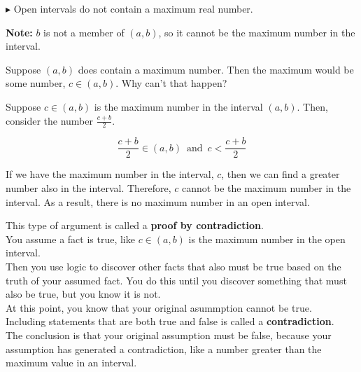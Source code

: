 \documentclass{ximera}
\begin{document}
$\blacktriangleright$ Open intervals do not contain a maximum real number.

\textbf{Note:} $b$ is not a member of $(a,b)$, so it cannot be the maximum number in the interval.   


\begin{explanation}

Suppose $(a,b)$ does contain a maximum number. Then the maximum would be some number, $c \in (a,b)$.  Why can't that happen?  


Suppose $c \in (a,b)$ is the maximum number in the interval $(a,b)$.  Then, consider the number  $\frac{c+b}{2}$.   

\[  \frac{c+b}{2} \in (a,b)  \, \text{ and } \,  c < \frac{c+b}{2} \]  


If we have the maximum number in the interval, $c$, then we can find a greater number also in the interval. Therefore, $c$ cannot be the maximum number in the interval.  As a result, there is no maximum number in an open interval. \\


\end{explanation}






\begin{paradox}

This type of argument is called a \textbf{proof by contradiction}.   \\

You assume a fact is true, like $c \in (a,b)$ is the maximum number in the open interval.  \\

Then you use logic to discover other facts that also must be true based on the truth of your assumed fact.  You do this until you discover something that must also be true, but you know it is not. \\

At this point, you know that your original asummption cannot be true. \\

Including statements that are both true and false is called a \textbf{contradiction}. \\

The conclusion is that your original assumption must be false, because your assumption has generated a contradiction, like a number greater than the maximum value in an interval.


\end{paradox}
\end{document}
